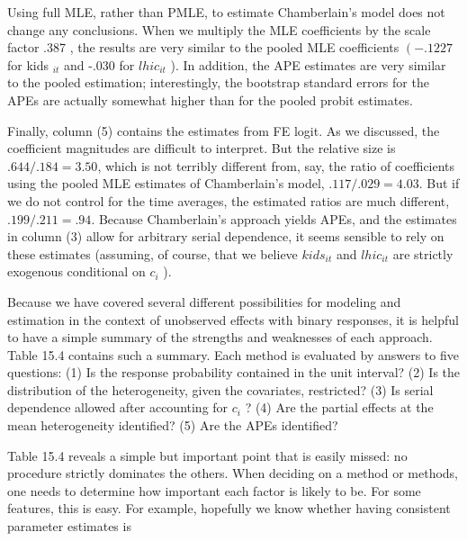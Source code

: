 \documentclass[10pt]{article}
\begin{document}
Using full MLE, rather than PMLE, to estimate Chamberlain's model does not change any conclusions. When we multiply the MLE coefficients by the scale factor .387 , the results are very similar to the pooled MLE coefficients $\left(-.1227\right.$ for kids ${ }_{i t}$ and -.030 for $l h i c_{i t}$ ). In addition, the APE estimates are very similar to the pooled estimation; interestingly, the bootstrap standard errors for the APEs are actually somewhat higher than for the pooled probit estimates.

Finally, column (5) contains the estimates from FE logit. As we discussed, the coefficient magnitudes are difficult to interpret. But the relative size is $.644 / .184=3.50$, which is not terribly different from, say, the ratio of coefficients using the pooled MLE estimates of Chamberlain's model, $.117 / .029=4.03$. But if we do not control for the time averages, the estimated ratios are much different, $.199 / .211=.94$. Because Chamberlain's approach yields APEs, and the estimates in column (3) allow for arbitrary serial dependence, it seems sensible to rely on these estimates (assuming, of course, that we believe $k i d s_{i t}$ and $l h i c_{i t}$ are strictly exogenous conditional on $c_{i}$ ).

Because we have covered several different possibilities for modeling and estimation in the context of unobserved effects with binary responses, it is helpful to have a simple summary of the strengths and weaknesses of each approach. Table 15.4 contains such a summary. Each method is evaluated by answers to five questions: (1) Is the response probability contained in the unit interval? (2) Is the distribution of the heterogeneity, given the covariates, restricted? (3) Is serial dependence allowed after accounting for $c_{i}$ ? (4) Are the partial effects at the mean heterogeneity identified? (5) Are the APEs identified?

Table 15.4 reveals a simple but important point that is easily missed: no procedure strictly dominates the others. When deciding on a method or methods, one needs to determine how important each factor is likely to be. For some features, this is easy. For example, hopefully we know whether having consistent parameter estimates is
\end{document}
